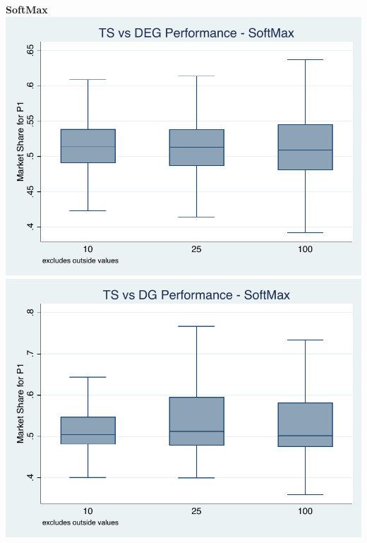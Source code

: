 \documentclass[11pt,letterpaper]{article}
\begin{document}
\pagebreak
\textbf{SoftMax} \\
\includegraphics[scale=0.75]{sm_ts_deg} \\
\includegraphics[scale=0.75]{sm_ts_dg} \\
\end{document}
